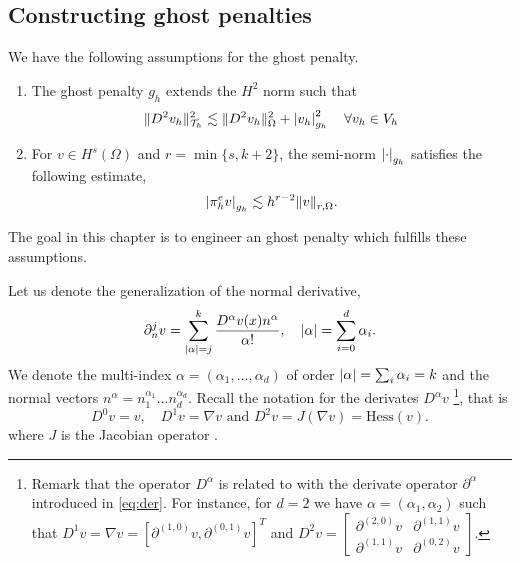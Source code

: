 
\subsection{Constructing ghost penalties}%
\label{sec:constructing_ghost_penalties}

We have the following assumptions for the ghost penalty.
\begin{enumerate}[label=\textbf{EP\arabic*}]
    \item \label{as:EP1} The ghost penalty $g_{h}$ extends the $H^{2}$ norm such that
        \begin{equation}
    \| D^2v_{h} \|_{ \mathcal{T} _{h} }^{ 2 }  \lesssim \| D^2 v_{h} \|_{ \Omega  }^{  2} + \left\lvert  v_{h}  \right\rvert _{g_{h}}^2 \quad \forall v_{h} \in V_{h}
        \end{equation}
\item \label{as:EP2} For $v \in H^{s}( \Omega ) $ and $r = \min \{s,k+2 \} $, the semi-norm $\left\lvert  \cdot   \right\rvert_{g_{h}} $ satisfies the following estimate, \[
    \left\lvert  \pi _{h}^{e} v  \right\rvert _{g_{h}} \lesssim  h^{r-2} \| v \|_{ r,\Omega  }^{  }.
    \]
\end{enumerate}
The goal in this chapter is to engineer an ghost penalty which fulfills these assumptions.

Let us denote the generalization of the normal derivative,
\begin{equation}
\partial _{n}^{j} v = \sum_{\left\lvert  \alpha   \right\rvert =j }^{k} \frac{D ^{\alpha }v( x) n^{\alpha }}{\alpha !}, \quad \left\lvert  \alpha   \right\rvert = \sum_{i=0}^{d} \alpha_{i}.
\end{equation}
We denote the multi-index $\alpha  = ( \alpha _{1}, \ldots, \alpha _{d})  $ of order $\left\lvert  \alpha   \right\rvert = \sum_{i}^{}  \alpha _{i} = k $   and the normal vectors $n^{\alpha } = n_{1}^{\alpha _{1}} \ldots n_{d}^{\alpha _{d}}$.
Recall the notation for the derivates $D^{\alpha } v$
\footnote{
Remark that the operator $D^{\alpha }$  is related to with the derivate operator $\partial ^{\alpha } $ introduced in \eqref{eq:der}. For instance, for $d=2$ we have $\alpha = ( \alpha _{1}, \alpha _{2}) $  such that $ D^{1} v =  \nabla v  = \left[ \partial ^{( 1,0 )} v,\partial ^{( 0,1 )}v
\right]^{T}$ and $   D^2 v  = \begin{bmatrix}
\partial ^{( 2,0 )} v &  \partial ^{( 1,1) }v \\
\partial ^{( 1,1 )} v &  \partial ^{( 0,2) }v
\end{bmatrix}
 $.
},
that is
\begin{equation}
D ^{0} v  = v, \quad   D ^{1}v  = \nabla v \text{ and }  D ^{2} v  = J(\nabla v) = \mathrm{Hess}(v).
\end{equation}
where $J$ is the Jacobian operator .

